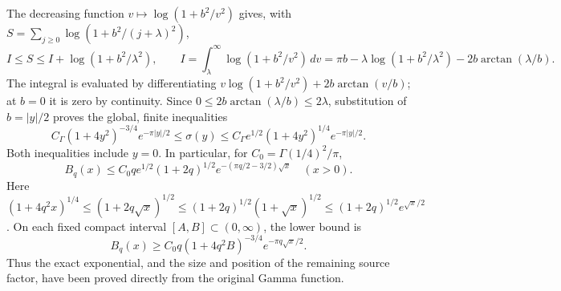 The decreasing function \(v\mapsto\log(1+b^2/v^2)\) gives, with
\(S=\sum_{j\geq0}\log(1+b^2/(j+\lambda)^2)\),
\[
 I\leq S\leq I+\log(1+b^2/\lambda^2),\qquad
 I=\int_\lambda^\infty\log(1+b^2/v^2)\,dv
  =\pi b-\lambda\log(1+b^2/\lambda^2)
                      -2b\arctan(\lambda/b).
\]
The integral is evaluated by differentiating
\(v\log(1+b^2/v^2)+2b\arctan(v/b)\); at \(b=0\) it is zero
by continuity. Since \(0\leq2b\arctan(\lambda/b)\leq2\lambda\),
substitution of \(b=|y|/2\) proves the global, finite inequalities
\[
 \boxed{C_\Gamma(1+4y^2)^{-3/4}e^{-\pi|y|/2}
 \leq\sigma(y)\leq
 C_\Gamma e^{1/2}(1+4y^2)^{1/4}e^{-\pi|y|/2}.}
 \tag{GEL4}
\]
Both inequalities include \(y=0\). In particular, for
\(C_0=\Gamma(1/4)^2/\pi\),
\[
 B_q(x)\leq C_0q e^{1/2}(1+2q)^{1/2}
            e^{-(\pi q/2-3/2)\sqrt x}\quad(x>0).
 \tag{GEL5}
\]
Here \((1+4q^2x)^{1/4}\leq(1+2q\sqrt x)^{1/2}
\leq(1+2q)^{1/2}(1+\sqrt x)^{1/2}
\leq(1+2q)^{1/2}e^{\sqrt x/2}\). On each fixed compact interval
\([A,B]\subset(0,\infty)\), the lower bound is
\[
 B_q(x)\geq C_0q(1+4q^2B)^{-3/4}e^{-\pi q\sqrt x/2}.
 \tag{GEL6}
\]
Thus the exact exponential, and the size and position of the remaining
source factor, have been proved directly from the original Gamma function.


